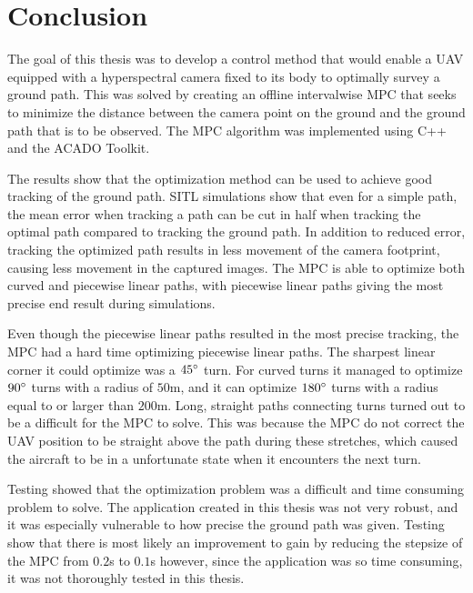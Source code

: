 \chapter{Conclusion}

The goal of this thesis was to develop a control method that would enable a UAV equipped with a hyperspectral camera fixed to its body to optimally survey a ground path. This was solved by creating an offline intervalwise MPC that seeks to minimize the distance between the camera point on the ground and the ground path that is to be observed. The MPC algorithm was implemented using C++ and the ACADO Toolkit.

The results show that the optimization method can be used to achieve good tracking of the ground path. SITL simulations show that even for a simple path, the mean error when tracking a path can be cut in half when tracking the optimal path compared to tracking the ground path. In addition to reduced error, tracking the optimized path results in less movement of the camera footprint, causing less movement in the captured images. The MPC is able to optimize both curved and piecewise linear paths, with piecewise linear paths giving the most precise end result during simulations.

Even though the piecewise linear paths resulted in the most precise tracking, the MPC had a hard time optimizing piecewise linear paths. The sharpest linear corner it could optimize was a $45\degree$ turn. For curved turns it managed to optimize $90\degree$ turns with a radius of $50$m, and it can optimize $180\degree$ turns with a radius equal to or larger than $200$m. Long, straight paths connecting turns turned out to be a difficult for the MPC to solve. This was because the MPC do not correct the UAV position to be straight above the path during these stretches, which caused the aircraft to be in a unfortunate state when it encounters the next turn.

Testing showed that the optimization problem was a difficult and time consuming problem to solve. The application created in this thesis was not very robust, and it was especially vulnerable to how precise the ground path was given. Testing show that there is most likely an improvement to gain by reducing the stepsize of the MPC from $0.2$s to $0.1$s however, since the application was so time consuming, it was not thoroughly tested in this thesis.


